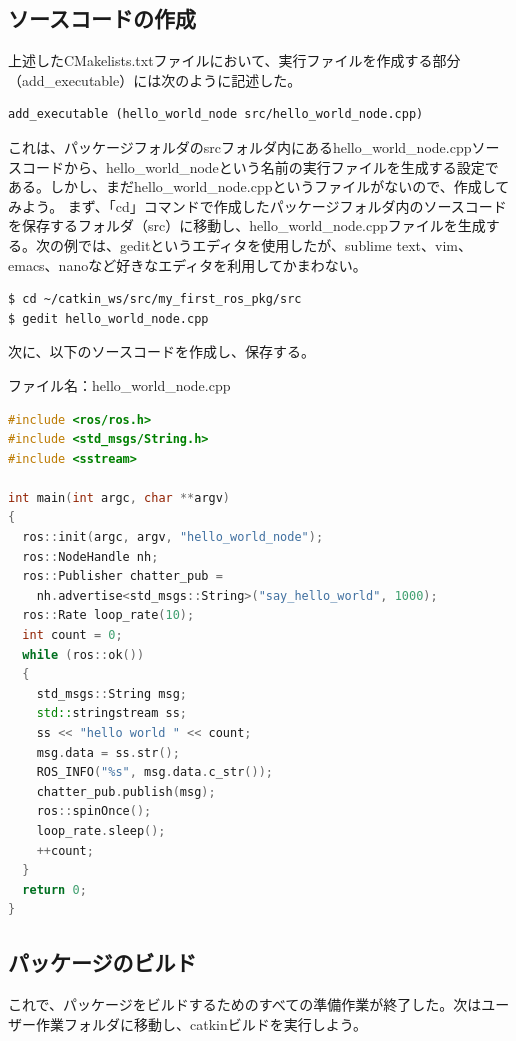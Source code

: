 \subsection{ソースコードの作成}
上述したCMakelists.txtファイルにおいて、実行ファイルを作成する部分（add\_executable）には次のように記述した。

\begin{lstlisting}[language=ROS]
add_executable (hello_world_node src/hello_world_node.cpp)
\end{lstlisting}

これは、パッケージフォルダのsrcフォルダ内にあるhello\_world\_node.cppソースコードから、hello\_world\_nodeという名前の実行ファイルを生成する設定である。しかし、まだhello\_world\_node.cppというファイルがないので、作成してみよう。
まず、「cd」コマンドで作成したパッケージフォルダ内のソースコードを保存するフォルダ（src）に移動し、hello\_world\_node.cppファイルを生成する。次の例では、geditというエディタを使用したが、sublime text、vim、emacs、nanoなど好きなエディタを利用してかまわない。

\begin{lstlisting}[language=ROS]
$ cd ~/catkin_ws/src/my_first_ros_pkg/src
$ gedit hello_world_node.cpp
\end{lstlisting}

次に、以下のソースコードを作成し、保存する。

ファイル名：hello\_world\_node.cpp

\begin{lstlisting}[language=C++]
#include <ros/ros.h>
#include <std_msgs/String.h>
#include <sstream>

int main(int argc, char **argv)
{
  ros::init(argc, argv, "hello_world_node");
  ros::NodeHandle nh;
  ros::Publisher chatter_pub =
    nh.advertise<std_msgs::String>("say_hello_world", 1000);
  ros::Rate loop_rate(10);
  int count = 0;
  while (ros::ok())
  {
    std_msgs::String msg;
    std::stringstream ss;
    ss << "hello world " << count;
    msg.data = ss.str();
    ROS_INFO("%s", msg.data.c_str());
    chatter_pub.publish(msg);
    ros::spinOnce();
    loop_rate.sleep();
    ++count;
  }
  return 0;
}
\end{lstlisting}

\subsection{パッケージのビルド}
これで、パッケージをビルドするためのすべての準備作業が終了した。次はユーザー作業フォルダに移動し、catkinビルドを実行しよう。


